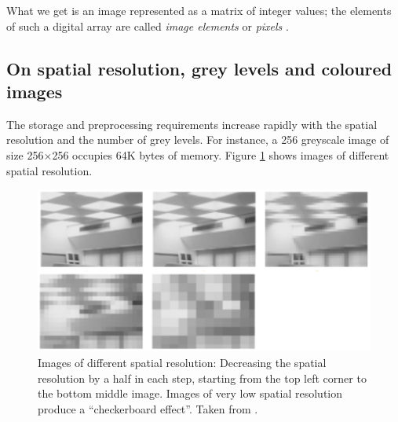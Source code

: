 What we get is an image represented as a matrix of integer values; the elements of such a digital array are called \textit{image elements} or \textit{pixels} \cite{pydata2018}.




\subsection{On spatial resolution, grey levels and coloured images}

The storage and preprocessing requirements increase rapidly with the spatial resolution and the number of grey levels. 
For instance, a 256 greyscale image of size 256\( \times \)256 occupies 64K bytes of memory. Figure \ref{fig:checkerboardEffect} shows images of different spatial resolution. 

\begin{figure}[H]
	\centering
	\includegraphics[width=\textwidth]{../Figures/checkerboard.png}
	\caption{Images of different spatial resolution: Decreasing the spatial resolution by a half in each step, starting from the top left corner to the bottom middle image. Images of very low spatial resolution produce a “checkerboard effect”.
	Taken from \cite{imagProcFundamentals}.}
	\label{fig:checkerboardEffect}
\end{figure}

%

